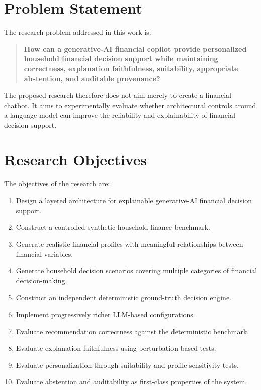 \documentclass[12pt,a4paper]{article}
\begin{document}
\section{Problem Statement}

The research problem addressed in this work is:

\begin{quote}
\textbf{How can a generative-AI financial copilot provide personalized household financial decision support while maintaining correctness, explanation faithfulness, suitability, appropriate abstention, and auditable provenance?}
\end{quote}

The proposed research therefore does not aim merely to create a financial chatbot. It aims to experimentally evaluate whether architectural controls around a language model can improve the reliability and explainability of financial decision support.

\section{Research Objectives}

The objectives of the research are:

\begin{enumerate}
    \item Design a layered architecture for explainable generative-AI financial decision support.
    \item Construct a controlled synthetic household-finance benchmark.
    \item Generate realistic financial profiles with meaningful relationships between financial variables.
    \item Generate household decision scenarios covering multiple categories of financial decision-making.
    \item Construct an independent deterministic ground-truth decision engine.
    \item Implement progressively richer LLM-based configurations.
    \item Evaluate recommendation correctness against the deterministic benchmark.
    \item Evaluate explanation faithfulness using perturbation-based tests.
    \item Evaluate personalization through suitability and profile-sensitivity tests.
    \item Evaluate abstention and auditability as first-class properties of the system.
\end{enumerate}
\end{document}
